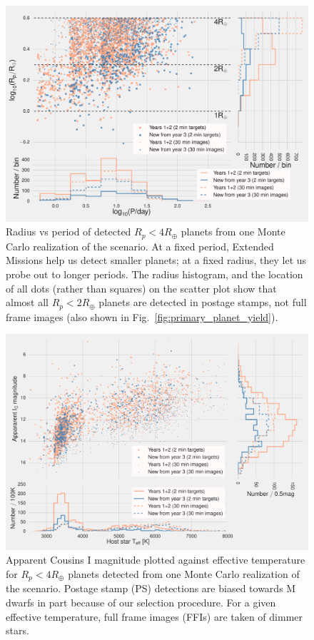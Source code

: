 \begin{figure}[t]
	\centering
	\includegraphics[]{figures/logR_vs_logP.pdf}
	\caption{Radius vs period of detected $R_p<4R_\oplus$ planets from one Monte Carlo realization of the \nhemi\:scenario.
	At a fixed period, Extended Missions help us detect smaller planets; at a fixed radius, they let us probe out to longer periods.
	The radius histogram, and the location of all dots (rather than squares) on the scatter plot show that almost all $R_p<2R_\oplus$ planets are detected in postage stamps, not full frame images (also shown in Fig.~\protect\ref{fig:primary_planet_yield}).}
	\label{fig:radius_vs_period_nhemi}
\end{figure}
\begin{figure}[t]
	\centering
	\includegraphics[]{figures/imag_vs_teff_nhemi_t20.pdf}
	\caption{Apparent Cousins I magnitude plotted against effective temperature for $R_p<4R_\oplus$ planets detected from one Monte Carlo realization of the \nhemi\:scenario. 
	Postage stamp (PS) detections are biased towards M dwarfs in part because of our selection procedure.
	For a given effective temperature, full frame images (FFIs) are taken of dimmer stars.}
	\label{fig:imag_vs_teff_nhemi}
\end{figure}

